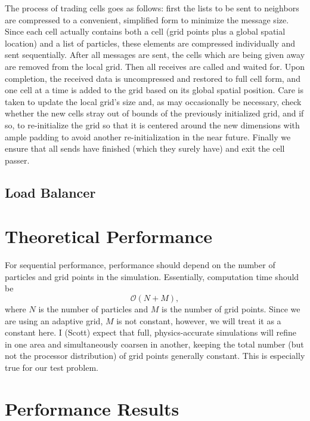 \documentclass[]{article}
\begin{document}
The process of trading cells goes as follows: first the lists to be sent to neighbors are compressed to a convenient, simplified form to minimize the message size. Since each cell actually contains both a cell (grid points plus a global spatial location) and a list of particles, these elements are compressed individually and sent sequentially. After all messages are sent, the cells which are being given away are removed from the local grid. Then all receives are called and waited for. Upon completion, the received data is uncompressed and restored to full cell form, and one cell at a time is added to the grid based on its global spatial position. Care is taken to update the local grid's size and, as may occasionally be necessary, check whether the new cells stray out of bounds of the previously initialized grid, and if so, to re-initialize the grid so that it is centered around the new dimensions with ample padding to avoid another re-initialization in the near future. Finally we ensure that all sends have finished (which they surely have) and exit the cell passer.

\subsection{Load Balancer}


\section{Theoretical Performance}
For sequential performance, performance should depend on the number of particles and grid points in the simulation.  Essentially, computation time should be 
\begin{equation}
\mathcal{O}(N + M),
\end{equation}
where $N$ is the number of particles and $M$ is the number of grid points.  Since we are using an adaptive grid, $M$ is not constant, however, we will treat it as a constant here.  I (Scott) expect that full, physics-accurate simulations will refine in one area and simultaneously coarsen in another, keeping the total number (but not the processor distribution) of grid points generally constant.  This is especially true for our test problem.

\section{Performance Results}
\end{document}
